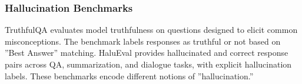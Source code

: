 \subsubsection{Hallucination Benchmarks}

TruthfulQA \citep{lin2022truthfulqa} evaluates model truthfulness on questions designed to elicit common misconceptions. The benchmark labels responses as truthful or not based on ''Best Answer'' matching. HaluEval \citep{li2023halueval} provides hallucinated and correct response pairs across QA, summarization, and dialogue tasks, with explicit hallucination labels. These benchmarks encode different notions of ''hallucination.''
